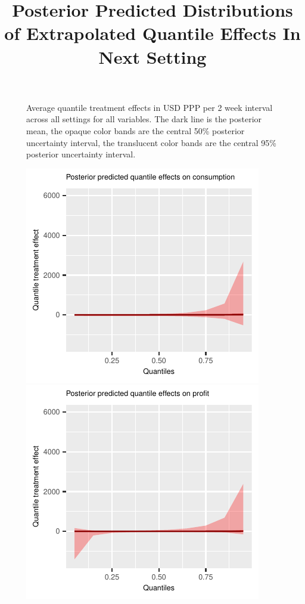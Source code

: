 \documentclass[AER]{AEA}
\begin{document}
\begin{figure}[h!]
  \caption{ Average quantile treatment effects in USD PPP per 2 week interval across all settings for all variables. The dark line is the posterior mean, the opaque color bands are the central 50\% posterior uncertainty interval, the translucent color bands are the central 95\% posterior uncertainty interval. }\label{posterior general quantiles}
\end{figure}




 \begin{figure}[h!]
  \centering
   \title{Posterior Predicted Distributions of Extrapolated Quantile Effects In Next Setting}
    \includegraphics{posterior_predicted_quantile_TEs_consumption_lognormal.pdf}
        \includegraphics{posterior_predicted_quantile_TEs_profit_lognormal.pdf}\\

\end{figure}
\end{document}
